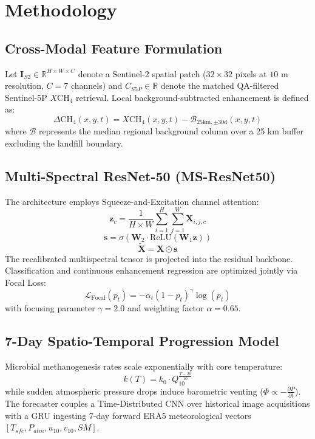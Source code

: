 \documentclass[journal]{IEEEtran}
\begin{document}
\section{Methodology}

\subsection{Cross-Modal Feature Formulation}
Let $\mathbf{I}_{S2} \in \mathbb{R}^{H \times W \times C}$ denote a Sentinel-2 spatial patch ($32 \times 32$ pixels at $10\text{ m}$ resolution, $C=7$ channels) and $C_{S5P} \in \mathbb{R}$ denote the matched QA-filtered Sentinel-5P $X\text{CH}_4$ retrieval. Local background-subtracted enhancement is defined as:
\begin{equation}
\Delta \text{CH}_4(x, y, t) = X\text{CH}_4(x, y, t) - \mathcal{B}_{25\text{km}, \pm 30\text{d}}(x, y, t)
\end{equation}
where $\mathcal{B}$ represents the median regional background column over a 25 km buffer excluding the landfill boundary.

\subsection{Multi-Spectral ResNet-50 (MS-ResNet50)}
The architecture employs Squeeze-and-Excitation channel attention:
\begin{equation}
\mathbf{z}_c = \frac{1}{H \times W} \sum_{i=1}^H \sum_{j=1}^W \mathbf{X}_{i, j, c}
\end{equation}
\begin{equation}
\mathbf{s} = \sigma\left( \mathbf{W}_2 \cdot \text{ReLU}(\mathbf{W}_1 \mathbf{z}) \right)
\end{equation}
\begin{equation}
\widetilde{\mathbf{X}} = \mathbf{X} \odot \mathbf{s}
\end{equation}
The recalibrated multispectral tensor is projected into the residual backbone. Classification and continuous enhancement regression are optimized jointly via Focal Loss:
\begin{equation}
\mathcal{L}_{\text{Focal}}(p_t) = -\alpha_t (1 - p_t)^\gamma \log(p_t)
\end{equation}
with focusing parameter $\gamma = 2.0$ and weighting factor $\alpha = 0.65$.

\subsection{7-Day Spatio-Temporal Progression Model}
Microbial methanogenesis rates scale exponentially with core temperature:
\begin{equation}
k(T) = k_0 \cdot Q_{10}^{\frac{T - 20}{10}}
\end{equation}
while sudden atmospheric pressure drops induce barometric venting ($\Phi \propto -\frac{\partial P}{\partial t}$). The forecaster couples a Time-Distributed CNN over historical image acquisitions with a GRU ingesting 7-day forward ERA5 meteorological vectors $[T_{sfc}, P_{atm}, u_{10}, v_{10}, SM]$.
\end{document}
